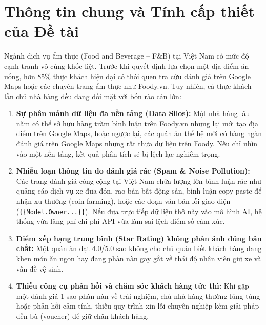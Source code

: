 \documentclass[12pt, a4paper, oneside]{book}
\begin{document}
\section{Thông tin chung và Tính cấp thiết của Đề tài}
Ngành dịch vụ ẩm thực (Food and Beverage -- F\&B) tại Việt Nam có mức độ cạnh tranh vô cùng khốc liệt. Trước khi quyết định lựa chọn một địa điểm ăn uống, hơn 85\% thực khách hiện đại có thói quen tra cứu đánh giá trên Google Maps hoặc các chuyên trang ẩm thực như Foody.vn. Tuy nhiên, cả thực khách lẫn chủ nhà hàng đều đang đối mặt với bốn rào cản lớn:
\begin{enumerate}
    \item \textbf{Sự phân mảnh dữ liệu đa nền tảng (Data Silos):} Một nhà hàng lâu năm có thể sở hữu hàng trăm bình luận trên Foody.vn nhưng lại mới tạo địa điểm trên Google Maps, hoặc ngược lại, các quán ăn thế hệ mới có hàng ngàn đánh giá trên Google Maps nhưng rất thưa dữ liệu trên Foody. Nếu chỉ nhìn vào một nền tảng, kết quả phân tích sẽ bị lệch lạc nghiêm trọng.
    \item \textbf{Nhiễu loạn thông tin do đánh giá rác (Spam \& Noise Pollution):} Các trang đánh giá công cộng tại Việt Nam chứa lượng lớn bình luận rác như quảng cáo dịch vụ xe đưa đón, rao bán bất động sản, bình luận copy-paste để nhận xu thưởng (coin farming), hoặc các đoạn văn bản lỗi giao diện (\texttt{\{\{Model.Owner...\}\}}). Nếu đưa trực tiếp dữ liệu thô này vào mô hình AI, hệ thống vừa lãng phí chi phí API vừa làm sai lệch điểm số cảm xúc.
    \item \textbf{Điểm xếp hạng trung bình (Star Rating) không phản ánh đúng bản chất:} Một quán ăn đạt 4.0/5.0 sao không cho chủ quán biết khách hàng đang khen món ăn ngon hay đang phàn nàn gay gắt về thái độ nhân viên giữ xe và vấn đề vệ sinh.
    \item \textbf{Thiếu công cụ phản hồi và chăm sóc khách hàng tức thì:} Khi gặp một đánh giá 1 sao phàn nàn về trải nghiệm, chủ nhà hàng thường lúng túng hoặc phản hồi cảm tính, thiếu quy trình xin lỗi chuyên nghiệp kèm giải pháp đền bù (voucher) để giữ chân khách hàng.
\end{enumerate}
\end{document}
